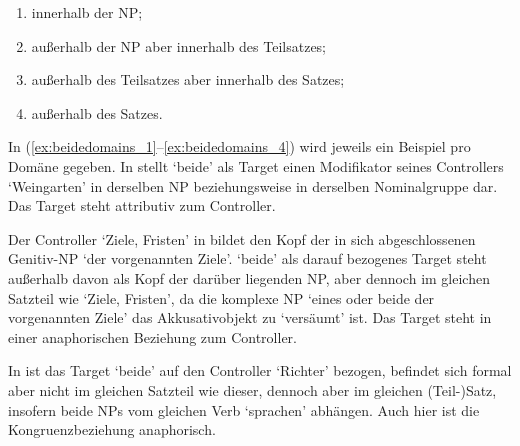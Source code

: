 \begin{enumerate}[noitemsep]
	\item innerhalb der NP;
	\item außerhalb der NP aber innerhalb des Teilsatzes;
	\item außerhalb des Teilsatzes aber innerhalb des Satzes;
	\item außerhalb des Satzes.
\end{enumerate}

In (\ref{ex:beidedomains_1}--\ref{ex:beidedomains_4}) wird jeweils ein Beispiel
pro Domäne gegeben. In  stellt  `beide' als
Target einen Modifikator seines Controllers  `Weingarten' in
derselben NP beziehungsweise in derselben Nominalgruppe dar. Das Target steht
attributiv zum Controller.


Der Controller  `Ziele, Fristen' in  bildet
den Kopf der in sich abgeschlossenen Genitiv-NP  `der
vorgenannten Ziele'.  `beide' als darauf bezogenes
Target steht außerhalb davon als Kopf der darüber liegenden NP, aber dennoch im
gleichen Satzteil wie  `Ziele, Fristen', da die komplexe NP
 `eines oder beide der
vorgenannten Ziele' das Akkusativobjekt zu  `versäumt'
ist. Das Target steht in einer anaphorischen Beziehung zum Controller.


In  ist das Target  `beide' auf den
Controller  `Richter' bezogen, befindet sich formal aber nicht im
gleichen Satzteil wie dieser, dennoch aber im gleichen (Teil-)Satz, insofern
beide NPs vom gleichen Verb  `sprachen' abhängen. Auch hier ist
die Kongruenzbeziehung anaphorisch.

